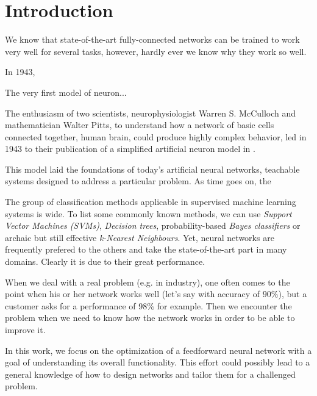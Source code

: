 \chapter{Introduction} \label{chap:introduction}

We know that state-of-the-art fully-connected networks can be trained to
work very well for several tasks, however, hardly ever we know why they work
so well.

In 1943,

The very first model of neuron...

The enthusiasm of two scientists, neurophysiologist Warren S. McCulloch and mathematician Walter Pitts, to understand how a network of basic cells connected together, human brain, could produce highly complex behavior, led in 1943 to their publication of a simplified artificial neuron model in \citep{mcculloch:neuron}.

This model laid the foundations of today's artificial neural networks, teachable systems designed to address a particular problem. As time goes on, the

\citep{sietsma:why_and_how}
The group of classification methods applicable in supervised machine learning systems is wide. To list some commonly known methods, we can use \textit{Support Vector Machines (SVMs)}, \textit{Decision trees}, probability-based \textit{Bayes classifiers} or archaic but still effective \textit{k-Nearest Neighbours}. Yet, neural networks are frequently prefered to the others and take the state-of-the-art part in many domains. Clearly it is due to their great performance. 

When we deal with a real problem (e.g. in industry), one often comes to the point when his or her network works well (let's say with accuracy of $ 90\% $), but a customer asks for a performance of $ 98\% $ for example. Then we encounter the problem when we need to know how the network works in order to be able to improve it.

In this work, we focus on the optimization of a feedforward neural network with a goal of understanding its overall functionality. This effort could possibly lead to a general knowledge of how to design networks and tailor them for a challenged problem.

